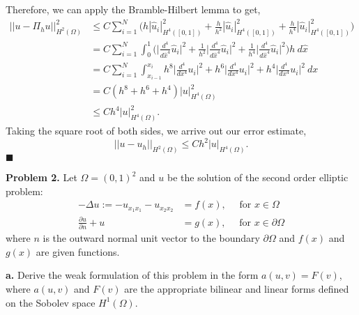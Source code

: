\documentclass[11pt]{article}
\begin{document}
Therefore, we can apply the Bramble-Hilbert lemma to get,
\begin{align*}
    ||u - \Pi_h u||^2_{H^2(\Omega)} &\leq C \sum_{i=1}^N \Big( h |\widehat{u}_i|^2_{H^4([0,1])} + \frac{h}{h^2} |\widehat{u}_i|^2_{H^4([0,1])} + \frac{h}{h^4} |\widehat{u}_i|^2_{H^4([0,1])} \Big) \\
    &= C \sum_{i=1}^N \int_0^1 \Big( \Big| \frac{d^4}{d\hat{x}^4}\widehat{u}_i \Big|^2 + \frac{1}{h^2}\Big| \frac{d^4}{d\hat{x}^4}\widehat{u}_i\Big|^2 +  \frac{1}{h^4}\Big| \frac{d^4}{d\hat{x}^4}\widehat{u}_i \Big|^2 \Big) h \: d\hat{x} \\ 
    &= C\sum_{i=1}^N  \int_{x_{i-1}}^{x_i} h^8 \Big|\frac{d^4}{dx^4} u_i \Big|^2 + h^6 \Big|\frac{d^4}{dx^4}u_i \Big|^2 + h^4 \Big| \frac{d^4}{dx^4} u_i \Big|^2 \: dx \\
    &= C (h^8 + h^6 + h^4) |u|^2_{H^4(\Omega)} \\
    &\leq Ch^4 |u|^2_{H^4(\Omega)}.
\end{align*}
Taking the square root of both sides, we arrive out our error estimate,
\begin{equation*}
    ||u - u_h||_{H^2(\Omega)} \leq Ch^2 |u|_{H^4(\Omega)}.
\end{equation*}
$\blacksquare$


\vskip 2cm





\textbf{Problem 2.} Let $\Omega = (0,1)^2$ and $u$ be the solution of the second order elliptic problem:
\begin{align}
	-\Delta u := -u_{x_1 x_1} - u_{x_2 x_2} &= f(x), \quad \text{ for } x\in \Omega \label{pb2_eq1} \\
    \frac{\partial u}{\partial n} + u &= g(x), \quad \text{ for } x\in\partial\Omega
\end{align}
where $n$ is the outward normal unit vector to the boundary $\partial \Omega$ and $f(x)$ and $g(x)$ are given functions.

\vskip 1cm

\textbf{a.} Derive the weak formulation of this problem in the form $a(u,v) = F(v)$, where $a(u,v)$ and $F(v)$ are the appropriate bilinear and linear forms defined on the Sobolev space $H^1(\Omega)$.

\vskip 1cm
\end{document}
